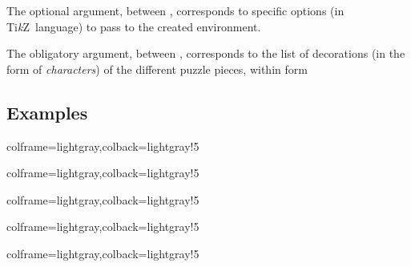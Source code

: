 \documentclass[11pt,a4paper]{ltxdoc}
\providecommand\tikzlogo{Ti\textit{k}Z}
\let\TikZ\tikzlogo
\begin{document}
\medskip

The optional argument, between , corresponds to specific options (in \TikZ\ language) to pass to the created environment.

\smallskip

The obligatory argument, between , corresponds to the list of decorations (in the form of \textit{characters}) of the different puzzle pieces, within form 

\subsection{Examples}

\begin{tcblisting}{colframe=lightgray,colback=lightgray!5}
\ThematicPuzzle{\faAngry,\faArchway,\faAtlas,\faAtom}
\end{tcblisting}

\begin{tcblisting}{colframe=lightgray,colback=lightgray!5}
\ThematicPuzzle[Labels={Maths,History,Geo,Chemistry}]%
  {\faAngry,\faArchway,\faAtlas,\faAtom}
\end{tcblisting}

\begin{tcblisting}{colframe=lightgray,colback=lightgray!5}
\ThematicPuzzle%
  [Scale=2,BgColors=yellow!25,Labels={Maths,History,Geo,Chemistry}]%
  {\faAngry,\faArchway,\faAtlas,\faAtom}
\end{tcblisting}

\begin{tcblisting}{colframe=lightgray,colback=lightgray!5}
\ThematicPuzzle%
  [Scale=3,BgColors={yellow!10,orange!10,red!10,teal!10},
  Labels={Maths,History,Geo,Chemistry}]%
  {\faAngry,\faArchway,\faAtlas,\faAtom}
\end{tcblisting}

\begin{tcblisting}{colframe=lightgray,colback=lightgray!5}
\end{tcblisting}
\end{document}
